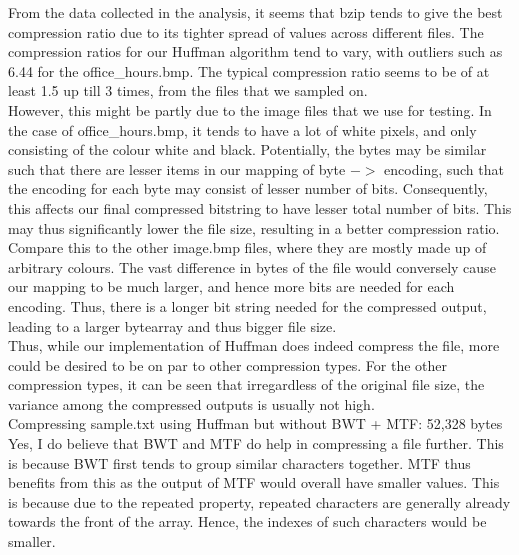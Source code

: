 \documentclass[12pt,letterpaper]{article}
\begin{document}
From the data collected in the analysis,
it seems that bzip tends to give the best compression ratio due
to its tighter spread of values across different files.
The compression ratios for our Huffman algorithm tend to vary,
with outliers such as 6.44 for the office\_hours.bmp.
The typical compression ratio seems to be of at least 1.5 up till 3 times,
from the files that we sampled on. \\

However, this might be partly due to the image files that we use for testing.
In the case of office\_hours.bmp, it tends to have a lot of white pixels,
and only consisting of the colour white and black.
Potentially, the bytes may be similar such that there are lesser items in our
mapping of byte $->$ encoding, such that the encoding for each byte may 
consist of lesser number of bits.
Consequently, this affects our final compressed bitstring to have lesser total number of bits.
This may thus significantly lower the file size, resulting in a better compression ratio. \\

Compare this to the other image.bmp files, where they are mostly
made up of arbitrary colours. 
The vast difference in bytes of the file would conversely cause our mapping
to be much larger, and hence more bits are needed for each encoding.
Thus, there is a longer bit string needed for the compressed output, 
leading to a larger bytearray and thus bigger file size. \\

Thus, while our implementation of Huffman does indeed compress the file, 
more could be desired to be on par to other compression types.
For the other compression types, it can be seen that irregardless of the original file size,
the variance among the compressed outputs is usually not high. \\

Compressing sample.txt using Huffman but without BWT + MTF: 52,328 bytes \\

Yes, I do believe that BWT and MTF do help in compressing a file further.
This is because BWT first tends to group similar characters together.
MTF thus benefits from this as the output of MTF would overall have smaller values.
This is because due to the repeated property, repeated characters are generally already towards the front of the array.
Hence, the indexes of such characters would be smaller.
\end{document}
